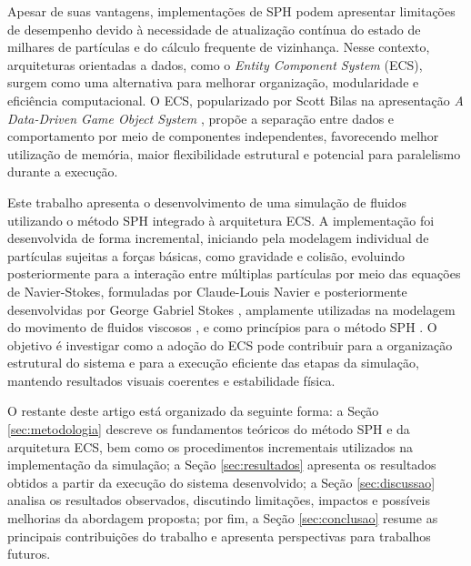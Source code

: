 Apesar de suas vantagens, implementações de SPH podem apresentar limitações de
desempenho devido à necessidade de atualização contínua do estado de milhares
de partículas e do cálculo frequente de vizinhança. Nesse contexto,
arquiteturas orientadas a dados, como o \textit{Entity Component System} (ECS),
surgem como uma alternativa para melhorar organização, modularidade e
eficiência computacional. O ECS, popularizado por Scott Bilas na apresentação
\textit{A Data-Driven Game Object System} \cite{bilas2002}, propõe a separação
entre dados e comportamento por meio de componentes independentes, favorecendo
melhor utilização de memória, maior flexibilidade estrutural e potencial para
paralelismo durante a execução.

Este trabalho apresenta o desenvolvimento de uma simulação de fluidos
utilizando o método SPH integrado à arquitetura ECS. A implementação foi
desenvolvida de forma incremental, iniciando pela modelagem individual de
partículas sujeitas a forças básicas, como gravidade e colisão, evoluindo
posteriormente para a interação entre múltiplas partículas por meio das
equações de Navier-Stokes, formuladas por Claude-Louis Navier e posteriormente
desenvolvidas por George Gabriel Stokes \cite{kline1972}, amplamente utilizadas
na modelagem do movimento de fluidos viscosos
\cite{batchelor1967,landau1987,ferziger2002}, e como princípios para o método
SPH \cite{monaghan2005}. O objetivo é investigar como a adoção do ECS pode
contribuir para a organização estrutural do sistema e para a execução eficiente
das etapas da simulação, mantendo resultados visuais coerentes e estabilidade
física.

O restante deste artigo está organizado da seguinte forma: a Seção
\ref{sec:metodologia} descreve os fundamentos teóricos do método SPH e da
arquitetura ECS, bem como os procedimentos incrementais utilizados na
implementação da simulação; a Seção \ref{sec:resultados} apresenta os
resultados obtidos a partir da execução do sistema desenvolvido; a Seção
\ref{sec:discussao} analisa os resultados observados, discutindo limitações,
impactos e possíveis melhorias da abordagem proposta; por fim, a Seção
\ref{sec:conclusao} resume as principais contribuições do trabalho e apresenta
perspectivas para trabalhos futuros.
